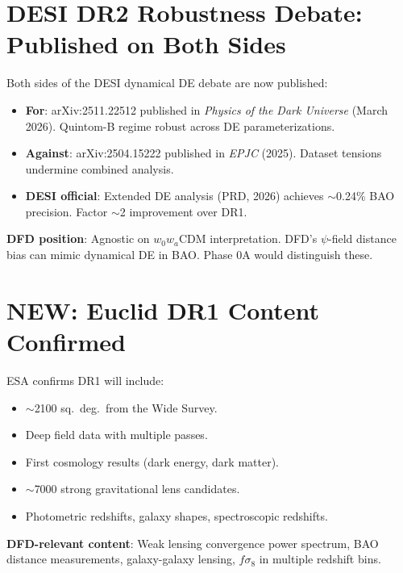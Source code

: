 \documentclass[11pt,a4paper]{article}
\newcommand{\NEW}{\textcolor{dfdblue}{\textbf{NEW}}}
\begin{document}
\section{DESI DR2 Robustness Debate: Published on Both Sides}

\begin{tcolorbox}[colback=blue!5!white, colframe=blue!60!black,
  title={DESI DR2: Robustness Debate Now Fully Published}]

Both sides of the DESI dynamical DE debate are now published:
\begin{itemize}
\item \textbf{For}: arXiv:2511.22512 published in \emph{Physics of the Dark Universe} (March 2026). Quintom-B regime robust across DE parameterizations.
\item \textbf{Against}: arXiv:2504.15222 published in \emph{EPJC} (2025). Dataset tensions undermine combined analysis.
\item \textbf{DESI official}: Extended DE analysis (PRD, 2026) achieves $\sim$0.24\% BAO precision. Factor $\sim$2 improvement over DR1.
\end{itemize}

\textbf{DFD position}: Agnostic on $w_0 w_a$CDM interpretation. DFD's $\psi$-field distance bias can mimic dynamical DE in BAO. Phase 0A would distinguish these.
\end{tcolorbox}

\section{\NEW: Euclid DR1 Content Confirmed}

\begin{tcolorbox}[colback=blue!5!white, colframe=blue!60!black,
  title={Euclid DR1 (21 October 2026): Content Confirmed}]

ESA confirms DR1 will include:
\begin{itemize}
\item $\sim$2100 sq.\ deg.\ from the Wide Survey.
\item Deep field data with multiple passes.
\item First cosmology results (dark energy, dark matter).
\item $\sim$7000 strong gravitational lens candidates.
\item Photometric redshifts, galaxy shapes, spectroscopic redshifts.
\end{itemize}

\textbf{DFD-relevant content}: Weak lensing convergence power spectrum, BAO distance measurements, galaxy-galaxy lensing, $f\sigma_8$ in multiple redshift bins.
\end{tcolorbox}
\end{document}
